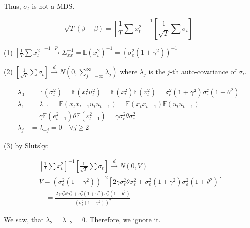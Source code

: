 {{\begin{enumerate}[label=(\alph*)]
{Thus, $\sigma_{t}$ is not a MDS.

$$
\sqrt{T}(\beta-\beta)=\left[\frac{1}{T} \sum x_{t}^{2}\right]^{-1}\left[\frac{1}{\sqrt{T}} \sum \sigma_{t}\right]
$$

(1) $\left[\frac{1}{T} \sum x_{t}^{2}\right]^{-1} \xrightarrow{p} \Sigma_{x x}^{-1}=\mathbb{E}\left(x_{t}^{2}\right)^{-1}=\left(\sigma_{e}^{2}\left(1+\gamma^{2}\right)\right)^{-1}$

(2) $\left[\frac{1}{\sqrt{T}} \sum \sigma_{t}\right] \xrightarrow{d} N\left(0, \sum_{j=-\infty}^{\infty} \lambda_{j}\right)$ where $\lambda_{j}$ is the $j$-th auto-covariance of $\sigma_{t}$.

$$
\begin{aligned}
\lambda_{0} & =\mathbb{E}\left(\sigma_{t}^{2}\right)=\mathbb{E}\left(x_{t}^{2} u_{t}^{2}\right)=\mathbb{E}\left(x_{t}^{2}\right) \mathbb{E}\left(v_{t}^{2}\right)=\sigma_{e}^{2}\left(1+\gamma^{2}\right) \sigma_{\varepsilon}^{2}\left(1+\theta^{2}\right) \\
\lambda_{1} & =\lambda_{-1}=\mathbb{E}\left(x_{t} x_{t-1} u_{t} u_{t-1}\right)=\mathbb{E}\left(x_{t} x_{t-1}\right) \mathbb{E}\left(u_{t} u_{t-1}\right) \\
& =\gamma \mathbb{E}\left(e_{t-1}^{2}\right) \theta \mathbb{E}\left(\varepsilon_{t-1}^{2}\right)=\gamma \sigma_{e}^{2} \theta \sigma_{\varepsilon}^{2} \\
\lambda_{j} & =\lambda_{-j}=0 \quad \forall j \geqslant 2
\end{aligned}
$$

(3) by Slutsky:

$$
\begin{aligned}
& \left[\frac{1}{T} \sum x_{t}^{2}\right]^{-1}\left[\frac{1}{\sqrt{T}} \sum \sigma_{t}\right] \xrightarrow{d} N(0, V) \\
& V=\left(\sigma_{e}^{2}\left(1+\gamma^{2}\right)\right)^{-2}\left[2 \gamma \sigma_{e}^{2} \theta \sigma_{\varepsilon}^{2}+\sigma_{e}^{2}\left(1+\gamma^{2}\right) \sigma_{\varepsilon}^{2}\left(1+\theta^{2}\right)\right] \\
& \quad=\frac{2 \gamma \sigma_{e}^{2} \theta \sigma_{\varepsilon}^{2}+\sigma_{e}^{2}\left(1+\gamma^{2}\right) \sigma_{\varepsilon}^{2}\left(1+\theta^{2}\right)}{\left(\sigma_{e}^{2}\left(1+\gamma^{2}\right)\right)^{2}}
\end{aligned}
$$
}
{\item 
We saw, that $\lambda_{2}=\lambda_{-2}=0$. Therefore, we ignore it.

}
\end{enumerate}}}
